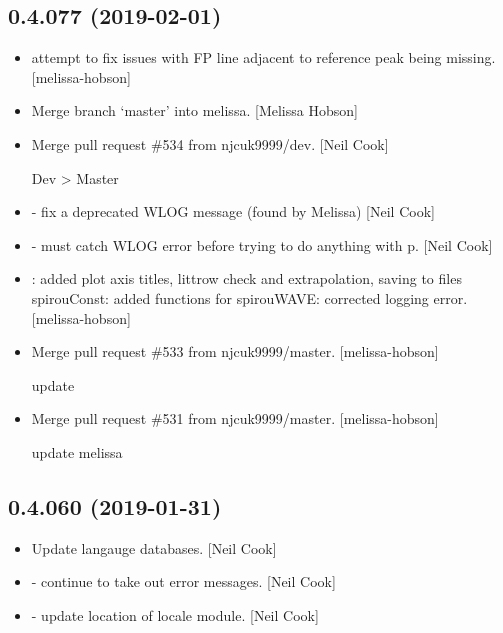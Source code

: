 \documentclass[a4paper,10pt,english]{report}
\begin{document}
\subsection{0.4.077 (2019-02-01)}
\label{\detokenize{misc/changelog:id200}}\begin{itemize}
\item {} 
 attempt to fix issues with FP line adjacent to
reference peak being missing. {[}melissa-hobson{]}

\item {} 
Merge branch ‘master’ into melissa. {[}Melissa Hobson{]}

\item {} 
Merge pull request \#534 from njcuk9999/dev. {[}Neil Cook{]}

Dev \textendash{}\textgreater{} Master

\item {} 
 - fix a deprecated WLOG message (found by Melissa) {[}Neil
Cook{]}

\item {} 
 - must catch WLOG error before trying to do anything with
p. {[}Neil Cook{]}

\item {} 
: added plot axis titles, littrow check and
extrapolation, saving to files spirouConst: added functions for
 spirouWAVE: corrected logging error. {[}melissa-hobson{]}

\item {} 
Merge pull request \#533 from njcuk9999/master. {[}melissa-hobson{]}

update

\item {} 
Merge pull request \#531 from njcuk9999/master. {[}melissa-hobson{]}

update melissa

\end{itemize}


\subsection{0.4.060 (2019-01-31)}
\label{\detokenize{misc/changelog:id201}}\begin{itemize}
\item {} 
Update langauge databases. {[}Neil Cook{]}

\item {} 
 - continue to take out error messages. {[}Neil Cook{]}

\item {} 
 - update location of locale module. {[}Neil Cook{]}

\end{itemize}
\end{document}
